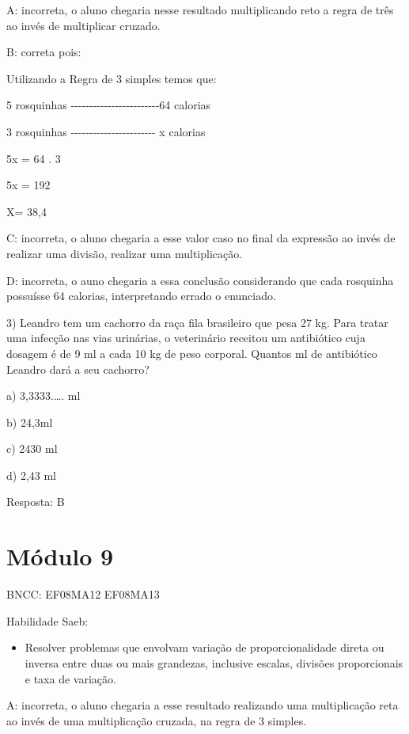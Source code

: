 A: incorreta, o aluno chegaria nesse resultado multiplicando reto a
regra de três ao invés de multiplicar cruzado.

B: correta pois:

Utilizando a Regra de 3 simples temos que:

5 rosquinhas
-\/-\/-\/-\/-\/-\/-\/-\/-\/-\/-\/-\/-\/-\/-\/-\/-\/-\/-\/-\/-\/-\/-\/-64
calorias

3 rosquinhas
-\/-\/-\/-\/-\/-\/-\/-\/-\/-\/-\/-\/-\/-\/-\/-\/-\/-\/-\/-\/-\/-\/- x
calorias

5x = 64 . 3

5x = 192

X= 38,4

C: incorreta, o aluno chegaria a esse valor caso no final da expressão
ao invés de realizar uma divisão, realizar uma multiplicação.

D: incorreta, o auno chegaria a essa conclusão considerando que cada
rosquinha possuísse 64 calorias, interpretando errado o enunciado.

3) Leandro tem um cachorro da raça fila brasileiro que pesa 27 kg. Para
tratar uma infecção nas vias urinárias, o veterinário receitou um
antibiótico cuja dosagem é de 9 ml a cada 10 kg de peso corporal.
Quantos ml de antibiótico Leandro dará a seu cachorro?

a) 3,3333.\ldots. ml

b) 24,3ml

c) 2430 ml

d) 2,43 ml

Resposta: B

\hypertarget{muxf3dulo-9}{%
\section{Módulo 9}\label{muxf3dulo-9}}

BNCC: EF08MA12 EF08MA13

Habilidade Saeb:

\begin{itemize}
\tightlist
\item
  Resolver problemas que envolvam variação de proporcionalidade direta
  ou inversa entre duas ou mais grandezas, inclusive escalas, divisões
  proporcionais e taxa de variação.
\end{itemize}

A: incorreta, o aluno chegaria a esse resultado realizando uma
multiplicação reta ao invés de uma multiplicação cruzada, na regra de 3
simples.

